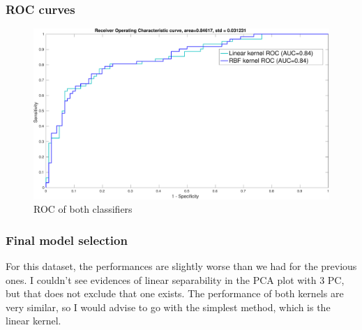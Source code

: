 \documentclass[11pt, a4paper]{article}
\begin{document}
\subsubsection{ROC curves}

\begin{figure}[H]
    \centering
    \includegraphics[scale=.40]{diabetes_ROC.pdf}
    \caption{ROC of both classifiers}
    \label{fig:diabetes_ROC}
\end{figure}

\subsubsection{Final model selection}

For this dataset, the performances are slightly worse than we had for
the previous ones. I couldn't see evidences of linear separability in
the PCA plot with 3 PC, but that does not exclude that one exists. The
performance of both kernels are very similar, so I would advise to go
with the simplest method, which is the linear kernel.

 
\end{document}
